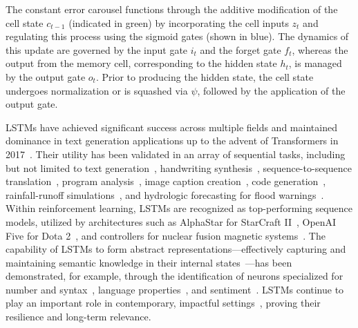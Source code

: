 The constant error carousel functions through the additive modification of the cell state $c_{t-1}$ (indicated in green) by incorporating the cell inputs $z_t$ and regulating this process using the sigmoid gates (shown in blue). The dynamics of this update are governed by the input gate $i_t$ and the forget gate $f_t$, whereas the output from the memory cell, corresponding to the hidden state $h_t$, is managed by the output gate $o_t$. Prior to producing the hidden state, the cell state undergoes normalization or is squashed via $\psi$, followed by the application of the output gate.

LSTMs have achieved significant success across multiple fields \citep{Hochreiter:01,Hochreiter:07,Schmidhuber:15} and maintained dominance in text generation applications up to the advent of Transformers in 2017~\citep{Vaswani:17}. Their utility has been validated in an array of sequential tasks, including but not limited to text generation~\citep{Graves:13,Karpathy:15blog}, handwriting synthesis~\citep{Graves:13}, sequence-to-sequence translation~\citep{Sutskever:14nips}, program analysis~\citep{Zaremba:14arxiv}, image caption creation~\citep{Karpathy:15,Hossain:19}, code generation~\citep{Karpathy:15blog}, rainfall-runoff simulations~\citep{Kratzert:18,Kratzert:19}, and hydrologic forecasting for flood warnings~\citep{Nearing:24}. Within reinforcement learning, LSTMs are recognized as top-performing sequence models, utilized by architectures such as AlphaStar for StarCraft II~\citep{Vinyals:17short}, OpenAI Five for Dota 2~\citep{OpenAI:19}, and controllers for nuclear fusion magnetic systems~\citep{Degrave:22short}. The capability of LSTMs to form abstract representations—effectively capturing and maintaining semantic knowledge in their internal states~\citep{Karpathy:15blog}—has been demonstrated, for example, through the identification of neurons specialized for number and syntax~\citep{Lakretz:19}, language properties~\citep{Bau:19}, and sentiment~\citep{Radford:17arxiv}. LSTMs continue to play an important role in contemporary, impactful settings~\citep{Degrave:22short,Nearing:24}, proving their resilience and long-term relevance.

